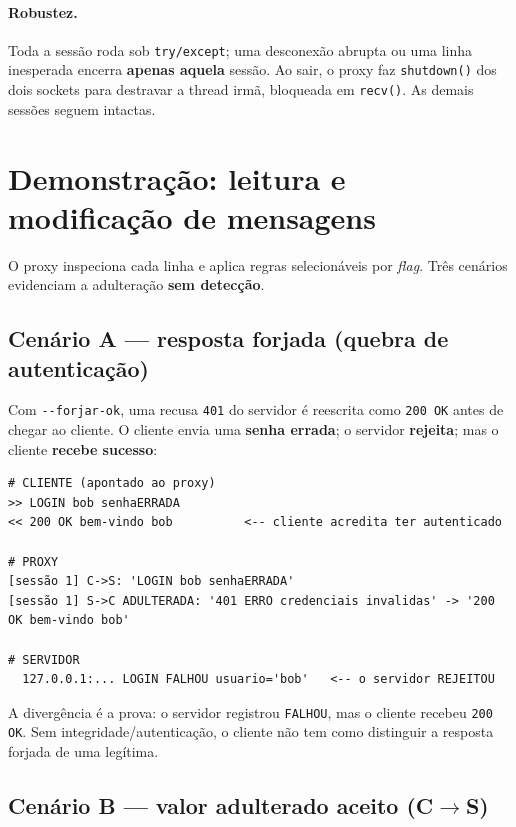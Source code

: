 \documentclass[11pt,a4paper]{article}
\begin{document}
\paragraph{Robustez.} Toda a sessão roda sob \texttt{try/except}; uma desconexão
abrupta ou uma linha inesperada encerra \textbf{apenas aquela} sessão. Ao sair, o
proxy faz \texttt{shutdown()} dos dois sockets para destravar a thread irmã,
bloqueada em \texttt{recv()}. As demais sessões seguem intactas.

\section{Demonstração: leitura e modificação de mensagens}
\label{sec:demo}

O proxy inspeciona cada linha e aplica regras selecionáveis por \textit{flag}.
Três cenários evidenciam a adulteração \textbf{sem detecção}.

\subsection{Cenário A — resposta forjada (quebra de autenticação)}

Com \texttt{-{}-forjar-ok}, uma recusa \texttt{401} do servidor é reescrita como
\texttt{200 OK} antes de chegar ao cliente. O cliente envia uma \textbf{senha
errada}; o servidor \textbf{rejeita}; mas o cliente \textbf{recebe sucesso}:

\begin{lstlisting}[style=saida,caption={Cenário A — saída do cliente (esquerda), do proxy e do servidor.}]
# CLIENTE (apontado ao proxy)
>> LOGIN bob senhaERRADA
<< 200 OK bem-vindo bob          <-- cliente acredita ter autenticado

# PROXY
[sessão 1] C->S: 'LOGIN bob senhaERRADA'
[sessão 1] S->C ADULTERADA: '401 ERRO credenciais invalidas' -> '200 OK bem-vindo bob'

# SERVIDOR
  127.0.0.1:... LOGIN FALHOU usuario='bob'   <-- o servidor REJEITOU
\end{lstlisting}

A divergência é a prova: o servidor registrou \texttt{FALHOU}, mas o cliente
recebeu \texttt{200 OK}. Sem integridade/autenticação, o cliente não tem como
distinguir a resposta forjada de uma legítima.

\subsection{Cenário B — valor adulterado aceito (C\texorpdfstring{$\rightarrow$}{->}S)}
\end{document}
